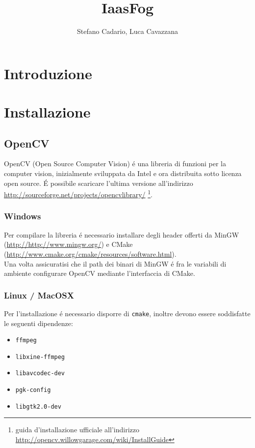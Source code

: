 \documentclass[12pt]{article}
\title {IaasFog}
\author{Stefano Cadario, Luca Cavazzana}
\begin{document}
\maketitle
\data{\date}

\tableofcontents

\chapter{Introduzione}
\chapter{Installazione}
\section{OpenCV}
OpenCV (Open Source Computer Vision) \'e una libreria di funzioni per la computer vision, inizialmente sviluppata da Intel e ora distribuita sotto licenza open source. \'E possibile scaricare l'ultima versione all'indirizzo \url{http://sourceforge.net/projects/opencvlibrary/} \footnote{guida d'installazione ufficiale all'indirizzo \url{http://opencv.willowgarage.com/wiki/InstallGuide}}.

\subsection{Windows}
Per compilare la libreria \'e necessario installare degli header offerti da MinGW (\url{http://http://www.mingw.org/}) e CMake (\url{http://www.cmake.org/cmake/resources/software.html}).\\
\noindent Una volta assicuratisi che il path dei binari di MinGW \'e fra le variabili di ambiente configurare OpenCV mediante l'interfaccia di CMake.

\subsection{Linux / MacOSX}

\noindent Per l'installazione \'e necessario disporre di \verb|cmake|, inoltre devono essere soddisfatte le seguenti dipendenze:
\begin{itemize}
\item \verb|ffmpeg|
\item \verb|libxine-ffmpeg|
\item \verb|libavcodec-dev|
\item \verb|pgk-config|
\item \verb|libgtk2.0-dev|
\end{itemize}
\end{document}
